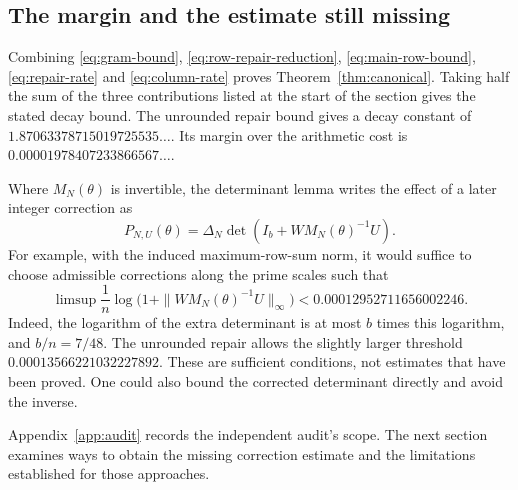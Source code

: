 \subsection{The margin and the estimate still missing}\label{subsec:remaining-estimate}

Combining \eqref{eq:gram-bound}, \eqref{eq:row-repair-reduction},
\eqref{eq:main-row-bound}, \eqref{eq:repair-rate} and
\eqref{eq:column-rate} proves Theorem~\ref{thm:canonical}.
Taking half the sum of the three contributions listed at the start of
the section gives the stated decay bound.
The unrounded repair bound gives a decay constant of
$1.87063378715019725535\ldots$. Its margin over the arithmetic cost is
$0.00001978407233866567\ldots$.

Where $M_N(\theta)$ is invertible, the determinant lemma writes the
effect of a later integer correction as
\[
 P_{N,U}(\theta)=\Delta_N
              \det(I_b+WM_N(\theta)^{-1}U).
\]
For example, with the induced maximum-row-sum norm, it would suffice
to choose admissible corrections along the prime scales such that
\begin{equation}\label{eq:missing-correction-bound}
 \limsup\frac1n\log\bigl(1+\|WM_N(\theta)^{-1}U\|_\infty\bigr)
 <0.00012952711656002246.
\end{equation}
Indeed, the logarithm of the extra determinant is at most $b$ times
this logarithm, and $b/n=7/48$. The unrounded repair allows the slightly
larger threshold $0.00013566221032227892$. These are sufficient
conditions, not estimates that have been proved. One could also bound
the corrected determinant directly and avoid the inverse.

Appendix~\ref{app:audit} records the independent audit's scope.
The next section examines ways to obtain the missing correction estimate
and the limitations established for those approaches.
